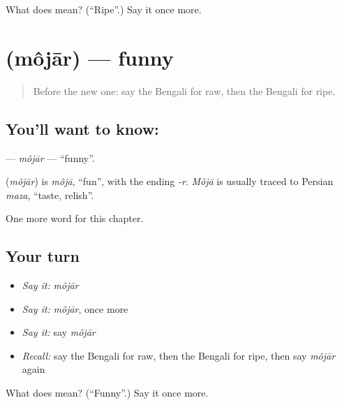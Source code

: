 \begin{tcolorbox}[breakable,colback=teal!4,colframe=teal!35!black,title={Before you move on}]
What does  mean? (\textquotedblleft{}Ripe\textquotedblright{}.) Say it once more.
\end{tcolorbox}
\section[\texorpdfstring{\bn{মজার} (môjār)}{মজার (môjār)}]{ (môjār) — funny}

\label{lesson:BN-C141-mojar}



\begin{quote}
Before the new one: say the Bengali for raw, then the Bengali for ripe.
\end{quote}

\subsection*{You'll want to know: }
\textbf{} — \emph{môjār} — \textquotedblleft{}funny\textquotedblright{}.

\begin{cousinweb}
\textbf{} (\emph{môjār}) is \emph{môjā}, \textquotedblleft{}fun\textquotedblright{}, with the ending \emph{-r}. \emph{Môjā} is usually traced to Persian \emph{maza}, \textquotedblleft{}taste, relish\textquotedblright{}.
\end{cousinweb}

\begin{grammarlens}[title={What you've built}]
One more word for this chapter.
\end{grammarlens}

\subsection*{Your turn}
\begin{itemize}
\raggedright
  \item \emph{Say it:} \emph{môjār}
  \item \emph{Say it:} \emph{môjār}, once more
  \item \emph{Say it:} say \emph{môjār}
  \item \emph{Recall:} say the Bengali for raw, then the Bengali for ripe, then say \emph{môjār} again
\end{itemize}

\begin{tcolorbox}[breakable,colback=teal!4,colframe=teal!35!black,title={Before you move on}]
What does  mean? (\textquotedblleft{}Funny\textquotedblright{}.) Say it once more.
\end{tcolorbox}
